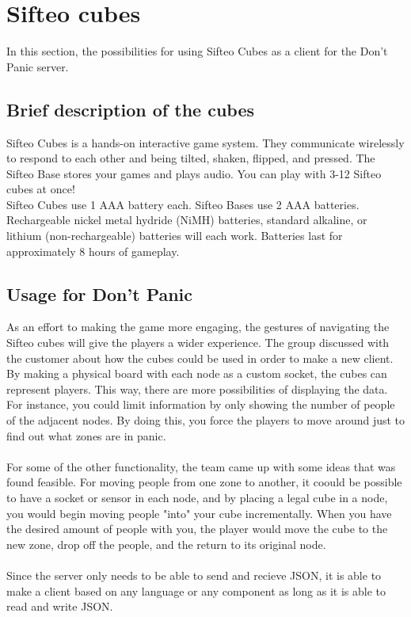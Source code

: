 \chapter{Sifteo cubes}

In this section, the possibilities for using Sifteo Cubes as a client for the Don't Panic server.

\section{Brief description of the cubes}
Sifteo Cubes is a hands-on interactive game system. They communicate wirelessly to respond to each other and being tilted, shaken, flipped, and pressed. The Sifteo Base stores your games and plays audio. You can play with 3-12 Sifteo cubes at once!\\ 
Sifteo Cubes use 1 AAA battery each. Sifteo Bases use 2 AAA batteries. Rechargeable nickel metal hydride (NiMH) batteries, standard alkaline, or lithium (non-rechargeable) batteries will each work. Batteries last for approximately 8 hours of gameplay. ~\cite{website:Sifteo}


\section{Usage for Don't Panic}

As an effort to making the game more engaging, the gestures of navigating the Sifteo cubes will give the players a wider experience. The group discussed with the customer about how the cubes could be used in order to make a new client. By making a physical board with each node as a custom socket, the cubes can represent players. This way, there are more possibilities of displaying the data. For instance, you could limit information by only showing the number of people of the adjacent nodes. By doing this, you force the players to move around just to find out what zones are in panic.\\
\\
For some of the other functionality, the team came up with some ideas that was found feasible. For moving people from one zone to another, it coould be possible to have a socket or sensor in each node, and by placing a legal cube in a node, you would begin moving people "into" your cube incrementally. When you have the desired amount of people with you, the player would move the cube to the new zone, drop off the people, and the return to its original node.\\
\\
Since the server only needs to be able to send and recieve JSON, it is able to make a client based on any language or any component as long as it is able to read and write JSON. \\


